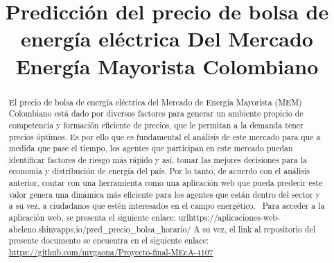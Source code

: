\documentclass[conference, 10pt]{IEEEtran}
\begin{document}
\title{Predicción del precio de bolsa de energía eléctrica Del Mercado Energía Mayorista Colombiano}

\author{
\and
{}
}

\maketitle

\begin{abstract}
El precio de bolsa de energía eléctrica del Mercado de Energía Mayorista (MEM) Colombiano está dado por diversos factores para generar un ambiente propicio de competencia y formación eficiente de precios, que le permitan a la demanda tener precios óptimos. Es por ello que es fundamental el análisis  de este mercado para que a medida que pase el tiempo, los agentes que participan en este mercado puedan identificar factores de riesgo más rápido y así, tomar las mejores decisiones para la economía y distribución de energía del país. Por lo tanto, de acuerdo con el análisis anterior, contar con una herramienta como una aplicación web que pueda predecir este valor genera una dinámica más eficiente para los agentes que están dentro del sector y a su vez, a ciudadanos que estén interesados en el campo energético. \
Para acceder a la aplicación web, se presenta el siguiente enlace: url{https://aplicaciones-web-abeleno.shinyapps.io/pred_precio_bolsa_horario/} A su vez, el link al  repositorio del presente documento se encuentra en el siguiente enlace: \url{https://github.com/mvgaona/Proyecto-final-MEcA-4107}
\end{abstract}
\end{document}
